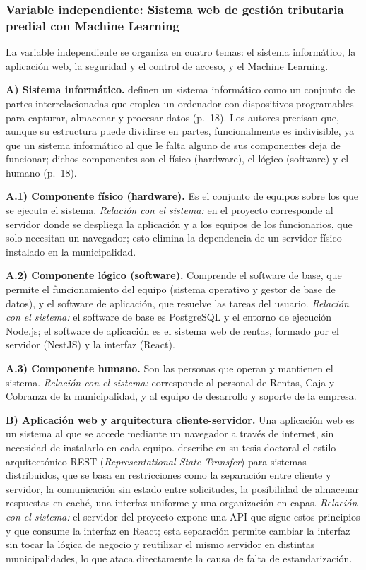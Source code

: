 \documentclass[12pt,a4paper]{report}
\begin{document}
\subsubsection{Variable independiente: Sistema web de gestión tributaria predial con Machine Learning}

La variable independiente se organiza en cuatro temas: el sistema informático, la aplicación web, la seguridad y el control de acceso, y el Machine Learning.

\noindent\textbf{A) Sistema informático.} \textcite{raya2014} definen un sistema informático como un conjunto de partes interrelacionadas que emplea un ordenador con dispositivos programables para capturar, almacenar y procesar datos (p.~18). Los autores precisan que, aunque su estructura puede dividirse en partes, funcionalmente es indivisible, ya que un sistema informático al que le falta alguno de sus componentes deja de funcionar; dichos componentes son el físico (hardware), el lógico (software) y el humano (p.~18).

\noindent\textbf{A.1) Componente físico (hardware).} Es el conjunto de equipos sobre los que se ejecuta el sistema. \textit{Relación con el sistema:} en el proyecto corresponde al servidor donde se despliega la aplicación y a los equipos de los funcionarios, que solo necesitan un navegador; esto elimina la dependencia de un servidor físico instalado en la municipalidad.

\noindent\textbf{A.2) Componente lógico (software).} Comprende el software de base, que permite el funcionamiento del equipo (sistema operativo y gestor de base de datos), y el software de aplicación, que resuelve las tareas del usuario. \textit{Relación con el sistema:} el software de base es PostgreSQL y el entorno de ejecución Node.js; el software de aplicación es el sistema web de rentas, formado por el servidor (NestJS) y la interfaz (React).

\noindent\textbf{A.3) Componente humano.} Son las personas que operan y mantienen el sistema. \textit{Relación con el sistema:} corresponde al personal de Rentas, Caja y Cobranza de la municipalidad, y al equipo de desarrollo y soporte de la empresa.

\noindent\textbf{B) Aplicación web y arquitectura cliente-servidor.} Una aplicación web es un sistema al que se accede mediante un navegador a través de internet, sin necesidad de instalarlo en cada equipo. \textcite{fielding2000} describe en su tesis doctoral el estilo arquitectónico REST (\textit{Representational State Transfer}) para sistemas distribuidos, que se basa en restricciones como la separación entre cliente y servidor, la comunicación sin estado entre solicitudes, la posibilidad de almacenar respuestas en caché, una interfaz uniforme y una organización en capas. \textit{Relación con el sistema:} el servidor del proyecto expone una API que sigue estos principios y que consume la interfaz en React; esta separación permite cambiar la interfaz sin tocar la lógica de negocio y reutilizar el mismo servidor en distintas municipalidades, lo que ataca directamente la causa de falta de estandarización.
\end{document}
